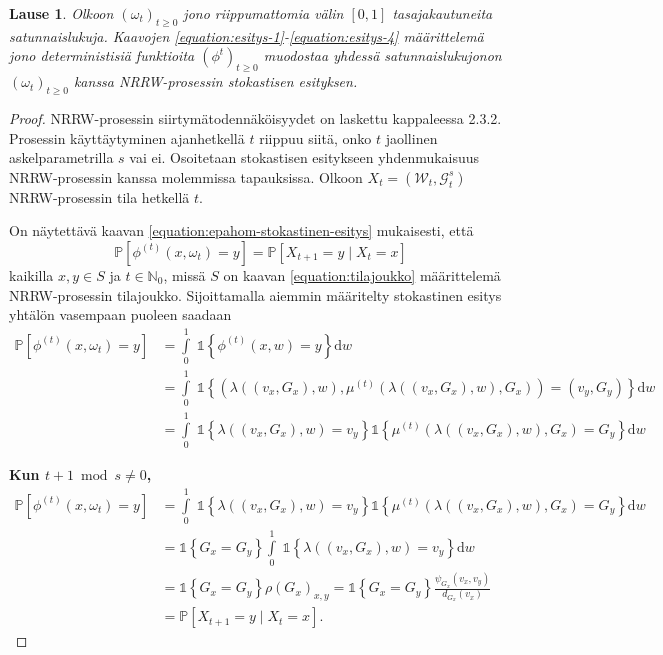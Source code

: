 \documentclass[finnish, 12pt, a4paper, sci, utf8, pdfa]{aaltothesis}
\newcommand{\N}{\mathbb{N}}
\newcommand{\Grandom}{\mathcal{G}}
\newcommand{\Wrandom}{\mathcal{W}}
\newcommand{\indicator}{\mathopen{\mathds{1}}}
\newcommand*{\prob}{\mathbb{P}}
\newtheorem{theorem}{Lause}
\begin{document}
\begin{theorem}
Olkoon $ (\omega_{t})_{t \geq 0} $ jono riippumattomia välin $ [0, 1] $ tasajakautuneita satunnaislukuja. Kaavojen \ref{equation:esitys-1}-\ref{equation:esitys-4} määrittelemä jono deterministisiä funktioita $ (\phi^{t})_{t \geq 0} $ muodostaa yhdessä satunnaislukujonon $ (\omega_{t})_{t \geq 0} $ kanssa NRRW-prosessin stokastisen esityksen.
\label{theorem:my-theorem}
\end{theorem}
\begin{proof}
NRRW-prosessin siirtymätodennäköisyydet on laskettu kappaleessa 2.3.2. Prosessin käyttäytyminen ajanhetkellä $ t $ riippuu siitä, onko $ t $ jaollinen askelparametrilla $ s $ vai ei. Osoitetaan stokastisen esitykseen yhdenmukaisuus NRRW-prosessin kanssa molemmissa tapauksissa. Olkoon $ X_{t} = (\Wrandom_{t}, \Grandom^{s}_{t}) $ NRRW-prosessin tila hetkellä $ t $. 

On näytettävä kaavan \ref{equation:epahom-stokastinen-esitys} mukaisesti, että
\[
   \prob \left[ \phi^{(t)}(x, \omega_{t}) = y \right] = \prob \left[ X_{t+1} = y \mid X_{t} = x \right] 
\]
kaikilla $ x, y \in S $ ja $ t \in \N_{0} $, missä $ S $ on kaavan \ref{equation:tilajoukko} määrittelemä NRRW-prosessin tilajoukko. Sijoittamalla aiemmin määritelty stokastinen esitys yhtälön vasempaan puoleen saadaan
\begin{align*}
   \prob \left[ \phi^{(t)}(x, \omega_{t}) = y \right] &= \int\limits_0^1 \; \indicator \left\{ \phi^{(t)}(x, w) = y \right\} \mathrm{d}w \\
                                                &= \int\limits_0^1 \; \indicator \left\{ \left( \lambda\left( (v_{x}, G_{x}), w \right), \mu^{(t)} \left( \lambda\left( (v_{x}, G_{x}), w \right), G_{x} \right) \right) = (v_{y}, G_{y}) \right\} \mathrm{d}w \\
                                                &= \int\limits_0^1 \; \indicator \left\{ \lambda\left( (v_{x}, G_{x}), w \right) = v_{y} \right\} \indicator \left\{ \mu^{(t)} \left( \lambda\left( (v_{x}, G_{x}), w \right), G_{x} \right) = G_{y} \right\} \mathrm{d}w
\end{align*}

{\parindent0pt
\textbf{Kun $ t + 1 \bmod s \neq 0 $,}
\begin{align*}
   \prob \left[ \phi^{(t)}(x, \omega_{t}) = y \right] &= \int\limits_0^1 \; \indicator \left\{ \lambda\left( (v_{x}, G_{x}), w \right) = v_{y} \right\} \indicator \left\{ \mu^{(t)} \left( \lambda\left( (v_{x}, G_{x}), w \right), G_{x} \right) = G_{y} \right\} \mathrm{d}w \\
                                                &= \indicator \left\{ G_{x} = G_{y} \right\} \int\limits_0^1 \; \indicator \left\{ \lambda\left( (v_{x}, G_{x}), w \right) = v_{y} \right\} \mathrm{d}w \\
                                                &= \indicator \left\{ G_{x} = G_{y} \right\} \rho(G_{x})_{x,y} = \indicator \left\{ G_{x} = G_{y} \right\} \frac{\psi_{G_{x}}(v_{x}, v_{y})}{d_{G_{x}}(v_{x})} \\
                                                &= \prob \left[ X_{t+1} = y \mid X_{t} = x \right].
\end{align*}

}
\end{proof}
\end{document}
